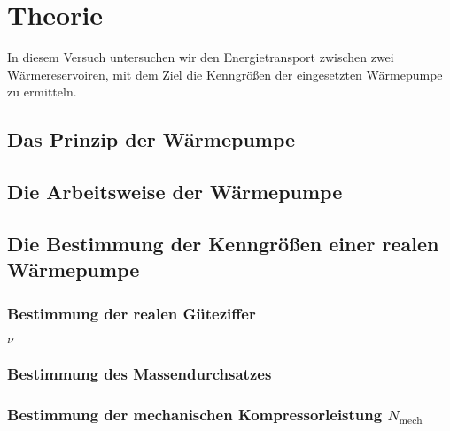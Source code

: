 \section{Theorie}
\label{sec:Theorie}

In diesem Versuch untersuchen wir den Energietransport zwischen 
zwei Wärmereservoiren, mit dem Ziel die Kenngrößen der 
eingesetzten Wärmepumpe zu ermitteln.

\subsection{Das Prinzip der Wärmepumpe}

\subsection{Die Arbeitsweise der Wärmepumpe}

\subsection{Die Bestimmung der Kenngrößen einer realen
Wärmepumpe}

\subsubsection{Bestimmung der realen Güteziffer}
$\nu$
\subsubsection{Bestimmung des Massendurchsatzes}
\subsubsection{Bestimmung der mechanischen Kompressorleistung 
$N_\text{mech}$}


